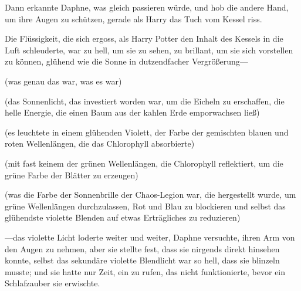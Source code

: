 Dann erkannte Daphne, was gleich passieren würde, und hob die andere Hand, um ihre Augen zu schützen, gerade als Harry das Tuch vom Kessel riss.

Die Flüssigkeit, die sich ergoss, als Harry Potter den Inhalt des Kessels in die Luft schleuderte, war zu hell, um sie zu sehen, zu brillant, um sie sich vorstellen zu können, glühend wie die Sonne in dutzendfacher Vergrößerung—

(was genau das war, was es war)

(das Sonnenlicht, das investiert worden war, um die Eicheln zu erschaffen, die helle Energie, die einen Baum aus der kahlen Erde emporwachsen ließ)

(es leuchtete in einem glühenden Violett, der Farbe der gemischten blauen und roten Wellenlängen, die das Chlorophyll absorbierte)

(mit fast keinem der grünen Wellenlängen, die Chlorophyll reflektiert, um die grüne Farbe der Blätter zu erzeugen)

(was die Farbe der Sonnenbrille der Chaos-Legion war, die hergestellt wurde, um grüne Wellenlängen durchzulassen, Rot und Blau zu blockieren und selbst das glühendste violette Blenden auf etwas Erträgliches zu reduzieren)

—das violette Licht loderte weiter und weiter, Daphne versuchte, ihren Arm von den Augen zu nehmen, aber sie stellte fest, dass sie nirgends direkt hinsehen konnte, selbst das sekundäre violette Blendlicht war so hell, dass sie blinzeln musste; und sie hatte nur Zeit, ein  zu rufen, das nicht funktionierte, bevor ein Schlafzauber sie erwischte.


